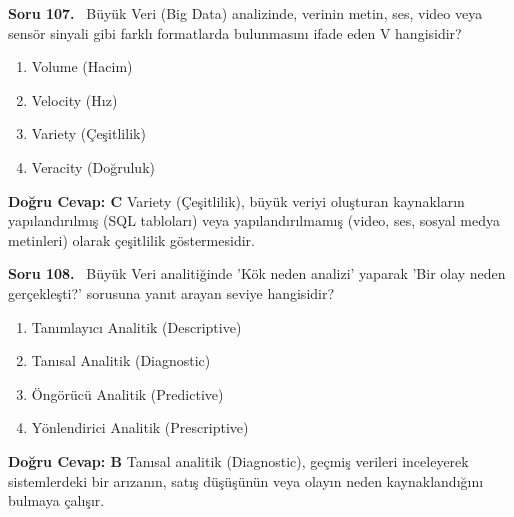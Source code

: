\documentclass[11pt,a4paper,openany]{book}
\begin{document}
\needspace{5cm}
\vspace{8pt}
\noindent\textbf{\large\sffamily Soru 107.} \ Büyük Veri (Big Data) analizinde, verinin metin, ses, video veya sensör sinyali gibi farklı formatlarda bulunmasını ifade eden V hangisidir?
\begin{enumerate}[label=\Alph*), leftmargin=25pt, topsep=4pt, itemsep=2pt]
    \item Volume (Hacim)
    \item Velocity (Hız)
    \item Variety (Çeşitlilik)
    \item Veracity (Doğruluk)
\end{enumerate}
\vspace{4pt}
\begin{tcolorbox}[title=Cevap ve Açıklama, colback=gray!3!white, colframe=primarycolor!90!black, arc=2mm, fonttitle=\bfseries\sffamily, top=6pt, bottom=6pt]
    \textbf{Doğru Cevap: C}
    \vspace{2pt}
    Variety (Çeşitlilik), büyük veriyi oluşturan kaynakların yapılandırılmış (SQL tabloları) veya yapılandırılmamış (video, ses, sosyal medya metinleri) olarak çeşitlilik göstermesidir.
\end{tcolorbox}
\vspace{10pt}

\needspace{5cm}
\vspace{8pt}
\noindent\textbf{\large\sffamily Soru 108.} \ Büyük Veri analitiğinde 'Kök neden analizi' yaparak 'Bir olay neden gerçekleşti?' sorusuna yanıt arayan seviye hangisidir?
\begin{enumerate}[label=\Alph*), leftmargin=25pt, topsep=4pt, itemsep=2pt]
    \item Tanımlayıcı Analitik (Descriptive)
    \item Tanısal Analitik (Diagnostic)
    \item Öngörücü Analitik (Predictive)
    \item Yönlendirici Analitik (Prescriptive)
\end{enumerate}
\vspace{4pt}
\begin{tcolorbox}[title=Cevap ve Açıklama, colback=gray!3!white, colframe=primarycolor!90!black, arc=2mm, fonttitle=\bfseries\sffamily, top=6pt, bottom=6pt]
    \textbf{Doğru Cevap: B}
    \vspace{2pt}
    Tanısal analitik (Diagnostic), geçmiş verileri inceleyerek sistemlerdeki bir arızanın, satış düşüşünün veya olayın neden kaynaklandığını bulmaya çalışır.
\end{tcolorbox}
\vspace{10pt}
\end{document}
